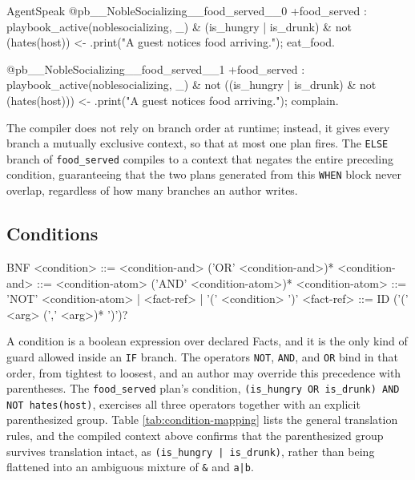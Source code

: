 \begin{codeblock}[]{AgentSpeak}
@pb__NobleSocializing__food_served__0
+food_served : playbook_active(noblesocializing, _)
    & (is_hungry | is_drunk) & not (hates(host)) <-
    .print("A guest notices food arriving.");
    eat_food.

@pb__NobleSocializing__food_served__1
+food_served : playbook_active(noblesocializing, _)
    & not ((is_hungry | is_drunk) & not (hates(host))) <-
    .print("A guest notices food arriving.");
    complain.
\end{codeblock}

The compiler does not rely on branch order at runtime; instead, it gives every branch a mutually exclusive context, so that at most one plan fires. The \lstinline|ELSE| branch of \lstinline|food_served| compiles to a context that negates the entire preceding condition, guaranteeing that the two plans generated from this \lstinline|WHEN| block never overlap, regardless of how many branches an author writes.

\subsection{Conditions}
\begin{codeblock}[]{BNF}
    <condition>      ::= <condition-and> ('OR' <condition-and>)*
    <condition-and>  ::= <condition-atom> ('AND' <condition-atom>)*
    <condition-atom> ::= 'NOT' <condition-atom> | <fact-ref> | '(' <condition> ')'
    <fact-ref>       ::= ID ('(' <arg> (',' <arg>)* ')')?
\end{codeblock}

A condition is a boolean expression over declared Facts, and it is the only kind of guard allowed inside an \lstinline|IF| branch. The operators \lstinline|NOT|, \lstinline|AND|, and \lstinline|OR| bind in that order, from tightest to loosest, and an author may override this precedence with parentheses. The \lstinline|food_served| plan's condition, \lstinline|(is_hungry OR is_drunk) AND NOT hates(host)|, exercises all three operators together with an explicit parenthesized group. Table \ref{tab:condition-mapping} lists the general translation rules, and the compiled context above confirms that the parenthesized group survives translation intact, as \lstinline+(is_hungry | is_drunk)+, rather than being flattened into an ambiguous mixture of \lstinline|&| and \lstinline+a|b+.

